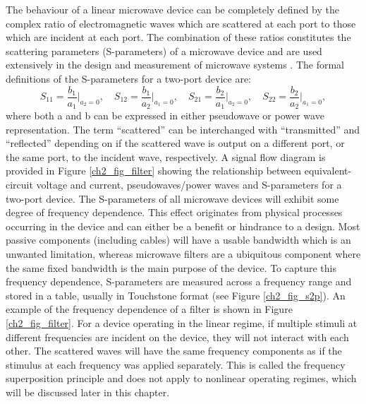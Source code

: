 \documentclass[../thesis/thesis.tex]{subfiles}
\begin{document}
The behaviour of a linear microwave device can be completely defined by the complex ratio of electromagnetic waves which are scattered at each port to those which are incident at each port. The combination of these ratios constitutes the scattering parameters (S-parameters) of a microwave device and are used extensively in the design and measurement of microwave systems \cite{Pozar_2004}. The formal definitions of the S-parameters for a two-port device are:
\begin{equation}
S_{11}=\dfrac{b_1}{a_1}\bigg\rvert_{a_2=0},\quad
S_{12}=\dfrac{b_1}{a_2}\bigg\rvert_{a_1=0},\quad
S_{21}=\dfrac{b_2}{a_1}\bigg\rvert_{a_2=0},\quad
S_{22}=\dfrac{b_2}{a_2}\bigg\rvert_{a_1=0},
\label{ch2_eqn_sp}
\end{equation}
where both a and b can be expressed in either pseudowave or power wave representation. The term “scattered” can be interchanged with “transmitted” and “reflected” depending on if the scattered wave is output on a different port, or the same port, to the incident wave, respectively. A signal flow diagram is provided in Figure \ref{ch2_fig_filter} showing the relationship between equivalent-circuit voltage and current, pseudowaves/power waves and S-parameters for a two-port device.
The S-parameters of all microwave devices will exhibit some degree of frequency dependence. This effect originates from physical processes occurring in the device and can either be a benefit or hindrance to a design. Most passive components (including cables) will have a usable bandwidth which is an unwanted limitation, whereas microwave filters are a ubiquitous component where the same fixed bandwidth is the main purpose of the device. To capture this frequency dependence, S-parameters are measured across a frequency range and stored in a table, usually in Touchstone format (see Figure \ref{ch2_fig_s2p}). An example of the frequency dependence of a filter is shown in Figure \ref{ch2_fig_filter}. For a device operating in the linear regime, if multiple stimuli at different frequencies are incident on the device, they will not interact with each other. The scattered waves will have the same frequency components as if the stimulus at each frequency was applied separately. This is called the frequency superposition principle and does not apply to nonlinear operating regimes, which will be discussed later in this chapter.
\end{document}
